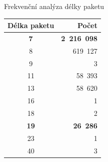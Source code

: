 \documentclass{beamer}
\begin{document}
\begin{frame} {Frekvenční analýza délky paketu}

	\begin{longtable} {|c|r|}
					\hline
			Délka paketu &  Počet \\ \hline
			\textbf{7}  &  \textbf{2~216~098}  \\
			8  &   619~127   \\
			9  &         3   \\
			11 &    58~393   \\
			13 &    58~620   \\
			16 &         1   \\
			18 &         2   \\
			\textbf{19} &    \textbf{26~286}   \\
			23 &         1   \\
			40 &         3   \\
			\hline
		\end{longtable}

\end{frame}


\end{document}
